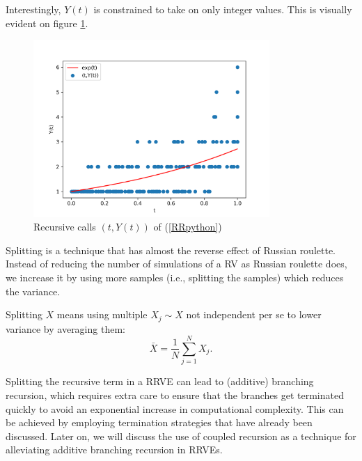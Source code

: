 \documentclass[a4paper,12pt]{article}
\begin{document}
\begin{pythonn} \label{RRpython}
    Interestingly, $Y(t)$ is constrained to take on only integer values.
    This is visually evident on figure \ref{plt russian roulette}.
    \begin{figure}[h!]
        \centering
        \includegraphics[width=0.8\textwidth]{plots/russian roulette example.png}
        \caption{Recursive calls $(t,Y(t))$ of (\ref{RRpython}) }
        \label{plt russian roulette}
    \end{figure}

\end{pythonn}

Splitting is a technique that has almost the reverse effect of Russian roulette.
Instead of reducing the number of simulations of a RV as Russian roulette does,
we increase it by using more samples (i.e., splitting the samples) which
reduces the variance.

\begin{definition}[splitting]
    Splitting $X$ means using multiple $X_{j} \sim X$ not independent per se to
    lower variance by averaging them:
    \[
        \bar{X}= \frac{1}{N} \sum_{j=1}^{N} X_{j}
        .\]
\end{definition}

Splitting the recursive term in a RRVE can lead to (additive) branching recursion,
which requires extra care to ensure that the branches get terminated quickly to avoid
an exponential increase in computational complexity. This can be achieved by employing
termination strategies that have already been discussed. Later on, we will discuss
the use of coupled recursion as a technique for alleviating additive branching
recursion in RRVEs.
\end{document}
